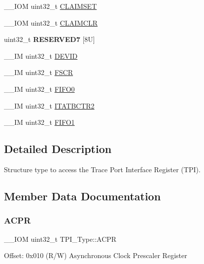 \begin{DoxyCompactItemize}
\+\_\+\+\_\+\+I\+OM uint32\+\_\+t \mbox{\hyperlink{struct_t_p_i___type_af8b7d15fa5252b733dd4b11fa1b5730a}{C\+L\+A\+I\+M\+S\+ET}}
\item 
\+\_\+\+\_\+\+I\+OM uint32\+\_\+t \mbox{\hyperlink{struct_t_p_i___type_a0e10e292cb019a832b03ddd055b2f6ac}{C\+L\+A\+I\+M\+C\+LR}}
\item 
\mbox{\label{struct_t_p_i___type_a33bb14730a444fdeeb91ea9cb7218e62}} 
uint32\+\_\+t {\bfseries R\+E\+S\+E\+R\+V\+E\+D7} \mbox{[}8\+U\mbox{]}
\item 
\+\_\+\+\_\+\+IM uint32\+\_\+t \mbox{\hyperlink{struct_t_p_i___type_abc0ecda8a5446bc754080276bad77514}{D\+E\+V\+ID}}
\item 
\+\_\+\+\_\+\+IM uint32\+\_\+t \mbox{\hyperlink{struct_t_p_i___type_ad6901bfd8a0089ca7e8a20475cf494a8}{F\+S\+CR}}
\item 
\+\_\+\+\_\+\+IM uint32\+\_\+t \mbox{\hyperlink{struct_t_p_i___type_aa4d7b5cf39dff9f53bf7f69bc287a814}{F\+I\+F\+O0}}
\item 
\+\_\+\+\_\+\+IM uint32\+\_\+t \mbox{\hyperlink{struct_t_p_i___type_ab358319b969d3fed0f89bbe33e9f1652}{I\+T\+A\+T\+B\+C\+T\+R2}}
\item 
\+\_\+\+\_\+\+IM uint32\+\_\+t \mbox{\hyperlink{struct_t_p_i___type_a061372fcd72f1eea871e2d9c1be849bc}{F\+I\+F\+O1}}
\end{DoxyCompactItemize}


\subsection{Detailed Description}
Structure type to access the Trace Port Interface Register (T\+PI). 

\subsection{Member Data Documentation}
\mbox{\label{struct_t_p_i___type_a9e5e4421ef9c3d5b7ff8b24abd4e99b3}} 
\subsubsection{\texorpdfstring{ACPR}{ACPR}}
{\footnotesize\ttfamily \+\_\+\+\_\+\+I\+OM uint32\+\_\+t T\+P\+I\+\_\+\+Type\+::\+A\+C\+PR}

Offset\+: 0x010 (R/W) Asynchronous Clock Prescaler Register \mbox{\label{struct_t_p_i___type_a0e10e292cb019a832b03ddd055b2f6ac}} 

